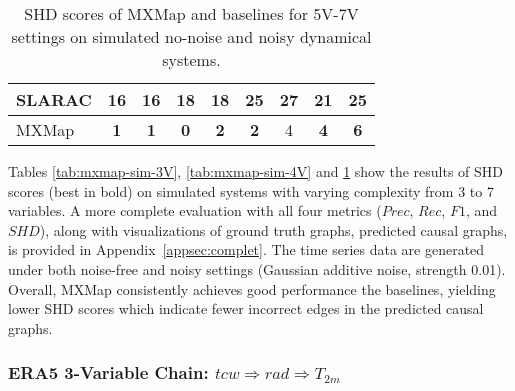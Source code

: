 \begin{table}[htb]
{{\begin{tabular}{l|cc|cc|cc|cc}
SLARAC                                          & 16                           & 16                         & 18                           & 18                         & 25                           & 27                         & 21                           & 25                        \\ \hline
MXMap                                           & \textbf{1}                   & \textbf{1}                 & \textbf{0}                   & \textbf{2}                 & \textbf{2}                   & 4                          & \textbf{4}                   & \textbf{6}               
\end{tabular}
} }
\caption{SHD scores of MXMap and baselines for 5V-7V settings on simulated no-noise and noisy dynamical systems.}
\label{tab:mxmap-sim-5-7V}
\end{table}


Tables \ref{tab:mxmap-sim-3V}, \ref{tab:mxmap-sim-4V} and \ref{tab:mxmap-sim-5-7V} show the results of SHD scores (best in bold) on simulated systems with varying complexity from 3 to 7 variables. A more complete evaluation with all four metrics ($Prec$, $Rec$, $F1$, and $SHD$), along with visualizations of ground truth graphs, predicted causal graphs, is provided in Appendix~\ref{appsec:complet}. The time series data are generated under both noise-free and noisy settings (Gaussian additive noise, strength 0.01). 
Overall, MXMap consistently achieves good performance the baselines, yielding lower SHD scores which indicate fewer incorrect edges in the predicted causal graphs.



\subsubsection{ERA5 3-Variable Chain: $tcw \Rightarrow rad \Rightarrow  T_{2m}$}
\label{sec:weather_chain}

